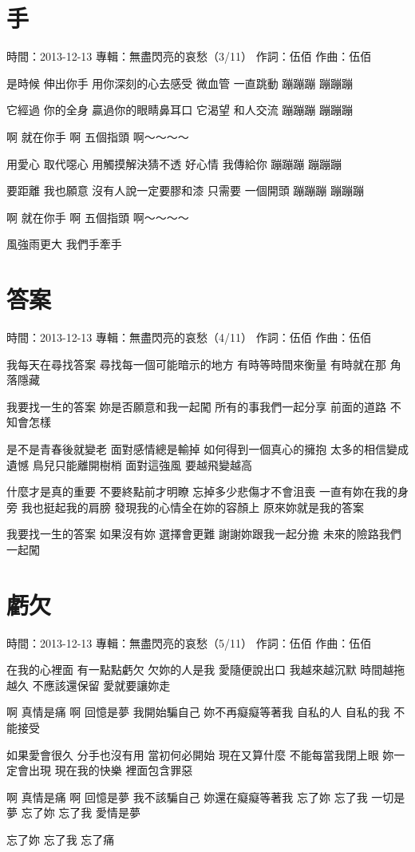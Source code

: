 \documentclass[UTF8,a4paper,oneside,twocolumn,12pt]{ctexbook}
\newcommand{\infopair}[2]{\textbullet #1：#2}
\newcommand{\zc}[1][伍佰]{\infopair{作詞}{#1}}
\newcommand{\zq}[1][伍佰]{\infopair{作曲}{#1}}
\newcommand{\zj}[1]{\infopair{專輯}{#1}}
\newcommand{\sj}[1]{\infopair{時間}{#1}}
\newenvironment{info}{\begin{flushleft}\kaishu
	}
	{\end{flushleft}\normalsize\yahei\par}
\newenvironment{lyric}{
	}
{}
\begin{document}
\section{手}
\begin{info}
	\sj{2013-12-13}
	\zj{無盡閃亮的哀愁（3/11）}
	\zc
	\zq
\end{info}
\begin{lyric}
	是時候 伸出你手
	用你深刻的心去感受
	微血管 一直跳動
	蹦蹦蹦 蹦蹦蹦

	它經過 你的全身
	贏過你的眼睛鼻耳口
	它渴望 和人交流
	蹦蹦蹦 蹦蹦蹦

	啊 就在你手
	啊 五個指頭
	啊～～～～

	用愛心 取代噁心
	用觸摸解決猜不透
	好心情 我傳給你
	蹦蹦蹦 蹦蹦蹦

	要距離 我也願意
	沒有人說一定要膠和漆
	只需要 一個開頭
	蹦蹦蹦 蹦蹦蹦

	啊 就在你手
	啊 五個指頭
	啊～～～～

	風強雨更大
	我們手牽手
\end{lyric}

\section{答案}
\begin{info}
	\sj{2013-12-13}
	\zj{無盡閃亮的哀愁（4/11）}
	\zc
	\zq
\end{info}
\begin{lyric}
	我每天在尋找答案
	尋找每一個可能暗示的地方
	有時等時間來衡量
	有時就在那 角落隱藏

	我要找一生的答案
	妳是否願意和我一起闖
	所有的事我們一起分享
	前面的道路 不知會怎樣

	是不是青春後就變老 面對感情總是輸掉
	如何得到一個真心的擁抱
	太多的相信變成遺憾 鳥兒只能離開樹梢
	面對這強風 要越飛變越高

	什麼才是真的重要 不要終點前才明瞭
	忘掉多少悲傷才不會沮喪
	一直有妳在我的身旁 我也挺起我的肩膀
	發現我的心情全在妳的容顏上
	原來妳就是我的答案

	我要找一生的答案
	如果沒有妳 選擇會更難
	謝謝妳跟我一起分擔
	未來的險路我們一起闖
\end{lyric}

\section{虧欠}
\begin{info}
	\sj{2013-12-13}
	\zj{無盡閃亮的哀愁（5/11）}
	\zc
	\zq
\end{info}
\begin{lyric}
	在我的心裡面 有一點點虧欠
	欠妳的人是我 愛隨便說出口
	我越來越沉默 時間越拖越久
	不應該還保留 愛就要讓妳走

	啊 真情是痛
	啊 回憶是夢
	我開始騙自己 妳不再癡癡等著我
	自私的人 自私的我 不能接受

	如果愛會很久 分手也沒有用
	當初何必開始 現在又算什麼
	不能每當我閉上眼 妳一定會出現
	現在我的快樂 裡面包含罪惡

	啊 真情是痛
	啊 回憶是夢
	我不該騙自己 妳還在癡癡等著我
	忘了妳 忘了我 一切是夢
	忘了妳 忘了我 愛情是夢

	忘了妳 忘了我 忘了痛
\end{lyric}
\end{document}
